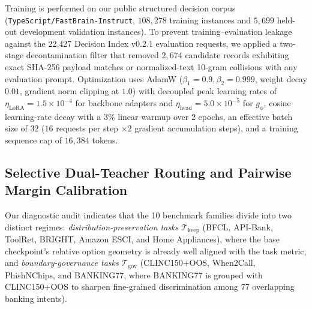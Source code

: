 \documentclass[10pt,twocolumn]{article}
\begin{document}
Training is performed on our public structured decision corpus (\texttt{TypeScript/FastBrain-Instruct}, $108{,}278$ training instances and $5{,}699$ held-out development validation instances). To prevent training--evaluation leakage against the 22,427 Decision Index v0.2.1 evaluation requests, we applied a two-stage decontamination filter that removed $2{,}674$ candidate records exhibiting exact SHA-256 payload matches or normalized-text 10-gram collisions with any evaluation prompt. Optimization uses AdamW ($\beta_1 = 0.9, \beta_2 = 0.999$, weight decay $0.01$, gradient norm clipping at $1.0$) with decoupled peak learning rates of $\eta_{\text{LoRA}} = 1.5 \times 10^{-4}$ for backbone adapters and $\eta_{\text{head}} = 5.0 \times 10^{-5}$ for $g_\phi$, cosine learning-rate decay with a $3\%$ linear warmup over $2$ epochs, an effective batch size of $32$ ($16$ requests per step $\times 2$ gradient accumulation steps), and a training sequence cap of $16{,}384$ tokens.

\subsection{Selective Dual-Teacher Routing and Pairwise Margin Calibration}
Our diagnostic audit indicates that the 10 benchmark families divide into two distinct regimes: \emph{distribution-preservation tasks} $\mathcal{T}_{\text{keep}}$ (BFCL, API-Bank, ToolRet, BRIGHT, Amazon ESCI, and Home Appliances), where the base checkpoint's relative option geometry is already well aligned with the task metric, and \emph{boundary-governance tasks} $\mathcal{T}_{\text{gov}}$ (CLINC150+OOS, When2Call, PhishNChips, and BANKING77, where BANKING77 is grouped with CLINC150+OOS to sharpen fine-grained discrimination among 77 overlapping banking intents).
\end{document}
